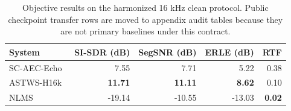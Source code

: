 \begin{table}[!t]
\caption{Objective results on the harmonized 16 kHz clean protocol. Public checkpoint transfer rows are moved to appendix audit tables because they are not primary baselines under this contract.}
\label{tab:clean-main}
\centering
\scriptsize
\begin{tabular}{@{}lrrrr@{}}
\hline
System & SI-SDR (dB) & SegSNR (dB) & ERLE (dB) & RTF \\
\hline
SC-AEC-Echo & 7.55 & 7.71 & 5.22 & 0.38 \\
ASTWS-H16k~\cite{zhao2024astws} & \textbf{11.71} & \textbf{11.11} & \textbf{8.62} & 0.10 \\
NLMS & -19.14 & -10.55 & -13.03 & \textbf{0.02} \\
\hline
\end{tabular}
\end{table}
